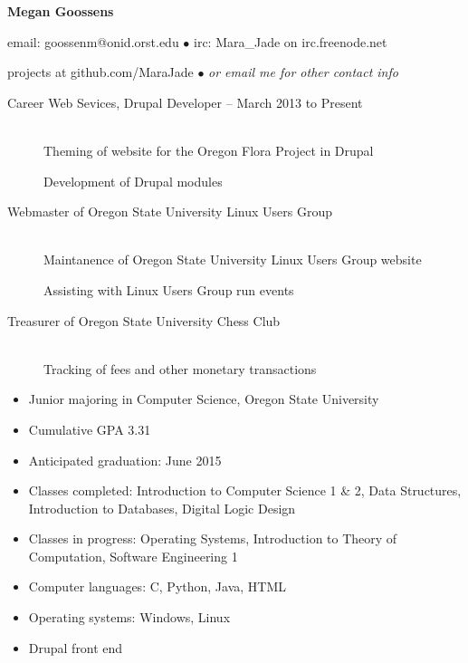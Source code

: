 \documentclass[11pt]{article}
\begin{document}
\centerline{{\LARGE \bf Megan Goossens}}

\bigskip

\centerline{email: goossenm@onid.orst.edu
        $\bullet$
        irc: Mara\_Jade on irc.freenode.net}
\centerline{projects at github.com/MaraJade 
        $\bullet$
        \emph{or email me for other contact info}}

\bigskip
\hrulefill
\bigskip

\begin{description}
\item[Career Web Sevices, Drupal Developer -- March 2013 to Present]
    \hfill \\
    Theming of website for the Oregon Flora Project in Drupal
    
    Development of Drupal modules
\end{description}

\smallskip
\hrulefill
\bigskip

\begin{description}
     \item[Webmaster of Oregon State University Linux Users Group]
        \hfill \\
        Maintanence of Oregon State University Linux Users Group website

        Assisting with Linux Users Group run events

   \item[Treasurer of Oregon State University Chess Club]
        \hfill \\ 
        Tracking of fees and other monetary transactions
\end{description}

\smallskip
\hrulefill
\bigskip

\begin{itemize}
    \item Junior majoring in Computer Science, Oregon State University 

    \item Cumulative GPA 3.31

    \item Anticipated graduation: June 2015

    \item Classes completed: Introduction to Computer Science 1 \& 2, Data Structures, Introduction to Databases, Digital Logic Design

    \item Classes in progress: Operating Systems, Introduction to Theory of Computation, Software Engineering 1
\end{itemize}

\begin{itemize}
  \item Computer languages: C, Python, Java, HTML

  \item Operating systems: Windows, Linux

  \item Drupal front end
\end{itemize}
\end{document}
